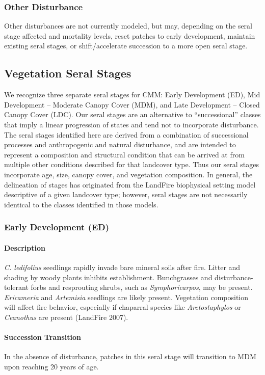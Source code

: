 \subsubsection{Other Disturbance}
Other disturbances are not currently modeled, but may, depending on the seral stage affected and mortality levels, reset patches to early development, maintain existing seral stages, or shift/accelerate succession to a more open seral stage. 

\subsection*{Vegetation Seral Stages}
We recognize three separate seral stages for CMM: Early Development (ED), Mid Development – Moderate Canopy Cover (MDM), and Late Development – Closed Canopy Cover (LDC). Our seral stages are an alternative to ``successional'' classes that imply a linear progression of states and tend not to incorporate disturbance. The seral stages identified here are derived from a combination of successional processes and anthropogenic and natural disturbance, and are intended to represent a composition and structural condition that can be arrived at from multiple other conditions described for that landcover type. Thus our seral stages incorporate age, size, canopy cover, and vegetation composition. In general, the delineation of stages has originated from the LandFire biophysical setting model descriptive of a given landcover type; however, seral stages are not necessarily identical to the classes identified in those models.

\subsubsection{Early Development (ED)}

\paragraph{Description} \emph{C. ledifolius} seedlings rapidly invade bare mineral soils after fire. Litter and shading by woody plants inhibits establishment. Bunchgrasses and disturbance-tolerant forbs and resprouting shrubs, such as \emph{Symphoricarpos}, may be present. \emph{Ericameria} and \emph{Artemisia} seedlings are likely present. Vegetation composition will affect fire behavior, especially if chaparral species like \emph{Arctostaphylos} or \emph{Ceanothus} are present (LandFire 2007).

\paragraph{Succession Transition} In the absence of disturbance, patches in this seral stage will transition to MDM upon reaching 20 years of age. 

